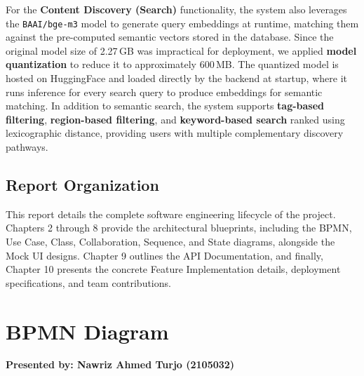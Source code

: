 \documentclass[11pt, a4paper]{report}
\begin{document}
For the \textbf{Content Discovery (Search)} functionality, the system also leverages the \texttt{BAAI/bge-m3} model to generate query embeddings at runtime, matching them against the pre-computed semantic vectors stored in the database. Since the original model size of 2.27\,GB was impractical for deployment, we applied \textbf{model quantization} to reduce it to approximately 600\,MB. The quantized model is hosted on HuggingFace and loaded directly by the backend at startup, where it runs inference for every search query to produce embeddings for semantic matching. In addition to semantic search, the system supports \textbf{tag-based filtering}, \textbf{region-based filtering}, and \textbf{keyword-based search} ranked using lexicographic distance, providing users with multiple complementary discovery pathways.

\section{Report Organization}
This report details the complete software engineering lifecycle of the project. Chapters 2 through 8 provide the architectural blueprints, including the BPMN, Use Case, Class, Collaboration, Sequence, and State diagrams, alongside the Mock UI designs. Chapter 9 outlines the API Documentation, and finally, Chapter 10 presents the concrete Feature Implementation details, deployment specifications, and team contributions.

\chapter{BPMN Diagram}
\textbf{Presented by: Nawriz Ahmed Turjo (2105032)} \\
\end{document}
